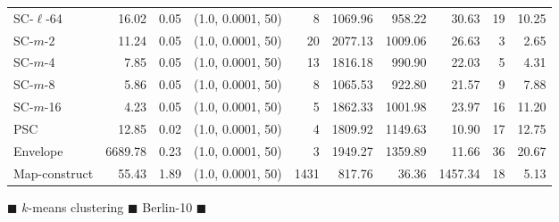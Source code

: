 \begin{figure}
\begin{center}
\begin{minipage}{\textwidth}
{\begin{tabular}{@{}lrrcrrrrrr@{}}
        SC-$\ell$-64 & 16.02 & 0.05 & (1.0, 0.0001, 50) & 8 & 1069.96 & 958.22 & 30.63 & 19 & 10.25\\
        SC-$m$-2 & 11.24 & 0.05 & (1.0, 0.0001, 50) & 20 & 2077.13 & 1009.06 & 26.63 & 3 & 2.65\\
        SC-$m$-4 & 7.85 & 0.05 & (1.0, 0.0001, 50) & 13 & 1816.18 & 990.90 & 22.03 & 5 & 4.31\\
        SC-$m$-8 & 5.86 & 0.05 & (1.0, 0.0001, 50) & 8 & 1065.53 & 922.80 & 21.57 & 9 & 7.88\\
        SC-$m$-16 & 4.23 & 0.05 & (1.0, 0.0001, 50) & 5 & 1862.33 & 1001.98 & 23.97 & 16 & 11.20\\
        PSC & 12.85 & 0.02 & (1.0, 0.0001, 50) & 4 & 1809.92 & 1149.63 & 10.90 & 17 & 12.75\\
        Envelope & 6689.78 & 0.23 & (1.0, 0.0001, 50) & 3 & 1949.27 & 1359.89 & 11.66 & 36 & 20.67\\
        Map-construct & 55.43 & 1.89 & (1.0, 0.0001, 50) & 1431 & 817.76 & 36.36 & 1457.34 & 18 & 5.13\\
        \bottomrule
    \end{tabular}
    }
\end{minipage}
\end{center}
        \caption{$\blacksquare$ $k$-means clustering $\blacksquare$ Berlin-10 $\blacksquare$}
 \end{figure}
\clearpage
\newpage 
%
%
\clearpage
